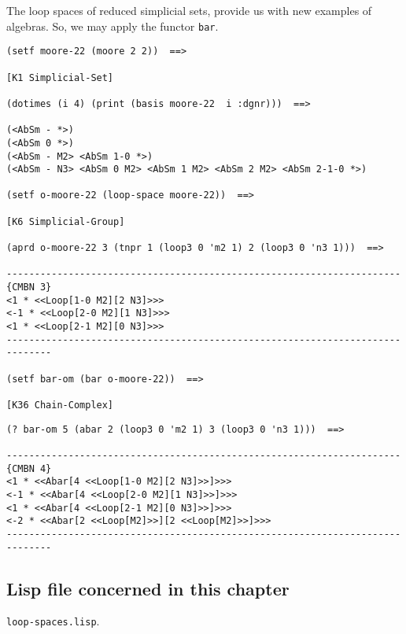 The loop spaces of reduced simplicial sets, provide us with new examples of algebras. So, we may apply
the functor {\tt bar}.
{\footnotesize\begin{verbatim}
(setf moore-22 (moore 2 2))  ==>

[K1 Simplicial-Set]

(dotimes (i 4) (print (basis moore-22  i :dgnr)))  ==>

(<AbSm - *>) 
(<AbSm 0 *>) 
(<AbSm - M2> <AbSm 1-0 *>) 
(<AbSm - N3> <AbSm 0 M2> <AbSm 1 M2> <AbSm 2 M2> <AbSm 2-1-0 *>) 

(setf o-moore-22 (loop-space moore-22))  ==>

[K6 Simplicial-Group]

(aprd o-moore-22 3 (tnpr 1 (loop3 0 'm2 1) 2 (loop3 0 'n3 1)))  ==>

----------------------------------------------------------------------{CMBN 3}
<1 * <<Loop[1-0 M2][2 N3]>>>
<-1 * <<Loop[2-0 M2][1 N3]>>>
<1 * <<Loop[2-1 M2][0 N3]>>>
------------------------------------------------------------------------------

(setf bar-om (bar o-moore-22))  ==>

[K36 Chain-Complex]
\end{verbatim}}
\newpage
{\footnotesize\begin{verbatim}
(? bar-om 5 (abar 2 (loop3 0 'm2 1) 3 (loop3 0 'n3 1)))  ==>

----------------------------------------------------------------------{CMBN 4}
<1 * <<Abar[4 <<Loop[1-0 M2][2 N3]>>]>>>
<-1 * <<Abar[4 <<Loop[2-0 M2][1 N3]>>]>>>
<1 * <<Abar[4 <<Loop[2-1 M2][0 N3]>>]>>>
<-2 * <<Abar[2 <<Loop[M2]>>][2 <<Loop[M2]>>]>>>
------------------------------------------------------------------------------
\end{verbatim}}

\subsection* {Lisp file concerned in this chapter}

{\tt loop-spaces.lisp}.

